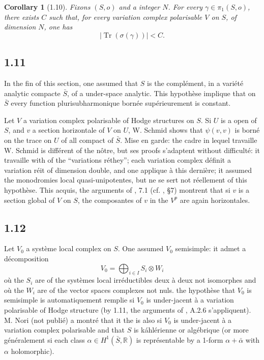 \documentclass[12pt,a4paper]{article}
\theoremstyle{plain}
\newtheorem{corollary}{Corollary}[section]
\theoremstyle{definition}
\DeclareMathOperator{\Tr}{Tr}
\newcommand{\RR}{\mathbb{R}}
\begin{document}
{\begin{corollary}[1.10]
Fixons $(S,o)$ and a integer $N$. For every $\gamma \in \pi_{1}(S,o)$, there exists $C$ such that, for every variation complex polarisable $V$ on $S$, of dimension $N$, one has
\[
|\Tr(\sigma(\gamma))| < C.
\]
\end{corollary}

\subsection*{1.11}
In the fin of this section, one assumed that $S$ is the compl\'{e}ment, in a vari\'{e}t\'{e} analytic compacte $\bar{S}$, of a under-space analytic. This hypoth\`{e}se implique that on $\bar{S}$ every function plurisubharmonique born\'{e}e sup\'{e}rieurement is constant.

Let $V$ a variation complex polarisable of Hodge structures on $S$. Si $U$ is a open of $S$, and $v$ a section horizontale of $V$ on $U$, W. Schmid \cite{Schmid} shows that $\psi(v,v)$ is born\'{e} on the trace on $U$ of all compact of $\bar{S}$. Mise en garde: the cadre in lequel travaille W. Schmid is diff\'{e}rent of the n\^{o}tre, but ses proofs s'adaptent without difficult\'{e}: it travaille with of the ``variations r\'{e}they''; each variation complex d\'{e}finit a variation r\'{e}it of dimension double, and one applique \cite{Schmid} \`{a} this derni\`{e}re; it assumed the monodromies local quasi-unipotentes, but ne se sert not r\'{e}ellement of this hypoth\`{e}se. This acquis, the arguments of \cite{GriffithsIII}, 7.1 (cf. \cite{Schmid}, \S7) montrent that si $v$ is a section global of $V$ on $S$, the composantes of $v$ in the $V^{p}$ are again horizontales.

\subsection*{1.12}
Let $V_{0}$ a syst\`{e}me local complex on $S$. One assumed $V_{0}$ semisimple: it admet a d\'{e}composition
\begin{equation}\label{eq:1.12.1}
V_{0} = \bigoplus_{i \in I} S_{i} \otimes W_{i}
\end{equation}
o\`{u} the $S_{i}$ are of the syst\`{e}mes local irr\'{e}ductibles deux \`{a} deux not isomorphes and o\`{u} the $W_{i}$ are of the vector spaces complexes not nuls. the hypoth\`{e}se that $V_{0}$ is semisimple is automatiquement remplie si $V_{0}$ is under-jacent \`{a} a variation polarisable of Hodge structure (by 1.11, the arguments of \cite{HodgeII}, A.2.6 s'appliquent). M. Nori (not publi\'{e}) a montr\'{e} that it the is also si $V_{0}$ is under-jacent \`{a} a variation complex polarisable and that $S$ is k\'{a}hl\'{e}rienne or alg\'{e}brique (or more g\'{e}n\'{e}ralement si each class $\alpha \in H^{1}(\bar{S}, \RR)$ is repr\'{e}sentable by a 1-form $\alpha + \bar{\alpha}$ with $\alpha$ holomorphic).

}
\end{document}
